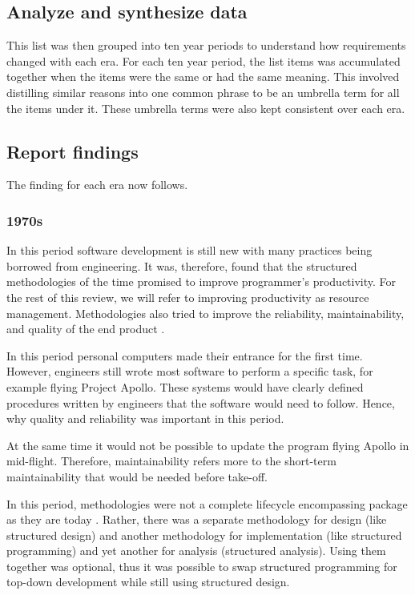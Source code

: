 \subsection{Analyze and synthesize data}
This list was then grouped into ten year periods to understand how requirements changed with each era.
For each ten year period, the list items was accumulated together when the items were the same or had the same meaning.
This involved distilling similar reasons into one common phrase to be an umbrella term for all the items under it.
These umbrella terms were also kept consistent over each era.


\subsection{Report findings}
The finding for each era now follows. 

\subsubsection{1970s}
In this period software development is still new with many practices being borrowed from engineering.
It was, therefore, found that the structured methodologies of the time promised to improve programmer's productivity.
For the rest of this review, we will refer to improving productivity as resource management.
Methodologies also tried to improve the reliability, maintainability, and quality of the end product \cite{yourdon_1977}.

In this period personal computers made their entrance for the first time.
However, engineers still wrote most software to perform a specific task, for example flying Project Apollo.
These systems would have clearly defined procedures written by engineers that the software would need to follow.
Hence, why quality and reliability was important in this period.

At the same time it would not be possible to update the program flying Apollo in mid-flight. 
Therefore, maintainability refers more to the short-term maintainability that would be needed before take-off.

In this period, methodologies were not a complete lifecycle encompassing package as they are today \cite{soi_1982, beregi_1985}.
Rather, there was a separate methodology for design (like structured design) and another methodology for implementation (like structured programming) and yet another for analysis (structured analysis).
Using them together was optional, thus it was possible to swap structured programming for top-down development while still using structured design. \cite{yourdon_1977}

